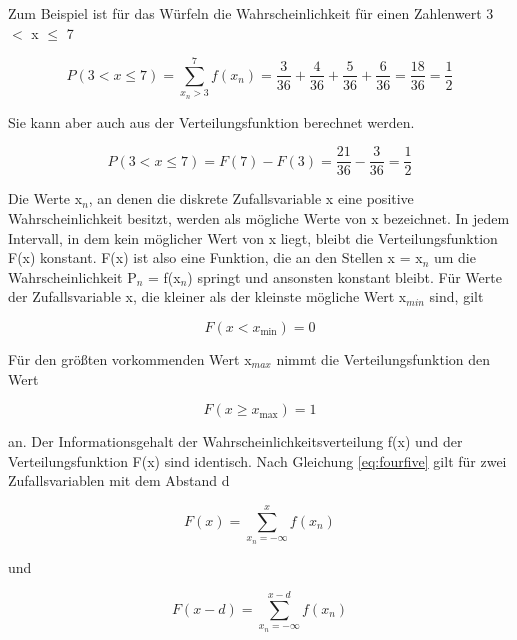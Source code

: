 \noindent Zum Beispiel ist f\"{u}r das W\"{u}rfeln die Wahrscheinlichkeit f\"{u}r einen Zahlenwert 3 $\mathrm{<}$ x $\leq$ 7 

\begin{equation}\label{eq:foursix}
P\left(3<x\le 7\right)=\sum _{x_{n} >3}^{7}f\left(x_{n} \right) =\dfrac{3}{36} +\dfrac{4}{36} +\dfrac{5}{36} +\dfrac{6}{36} =\dfrac{18}{36} =\dfrac{1}{2}
\end{equation}

\noindent Sie kann aber auch aus der Verteilungsfunktion berechnet werden. 

\begin{equation}\label{eq:fourseven}
P\left(3<x\le 7\right)=F\left(7\right)-F\left(3\right)=\dfrac{21}{36} -\dfrac{3}{36} =\dfrac{1}{2}
\end{equation}


\noindent Die Werte x$_{n}$, an denen die diskrete Zufallsvariable x eine positive Wahrscheinlichkeit besitzt, werden als m\"{o}gliche Werte von x bezeichnet. In jedem Intervall, in dem kein m\"{o}glicher Wert von x liegt, bleibt die Verteilungsfunktion F(x) konstant. F(x) ist also eine Funktion, die an den Stellen x = x$_{n}$ um die Wahrscheinlichkeit P$_{n}$ = f(x$_{n}$) springt und ansonsten konstant bleibt. F\"{u}r Werte der Zufallsvariable x, die kleiner als der kleinste m\"{o}gliche Wert x$_{min}$ sind, gilt

\begin{equation}\label{eq:foureight}
F(x<x_{\min })=0
\end{equation}

\noindent F\"{u}r den gr\"{o}{\ss}ten vorkommenden Wert x${}_{max}$ nimmt die Verteilungsfunktion den Wert 

\begin{equation}\label{eq:fournine}
F(x\ge x_{\max })=1
\end{equation}

\noindent an. Der Informationsgehalt der Wahrscheinlichkeitsverteilung f(x) und der Verteilungsfunktion F(x) sind identisch. Nach Gleichung \eqref{eq:fourfive} gilt f\"{u}r zwei Zufallsvariablen mit dem Abstand d 

\begin{equation}\label{eq:fourten}
F\left(x\right)=\sum _{x_{n} =-\infty }^{x}f\left(x_{n} \right)
\end{equation}

\noindent und

\begin{equation}\label{eq:foureleven}
F(x-d)=\sum _{x_{n} =-\infty }^{x-d}f(x_{n})
\end{equation}

